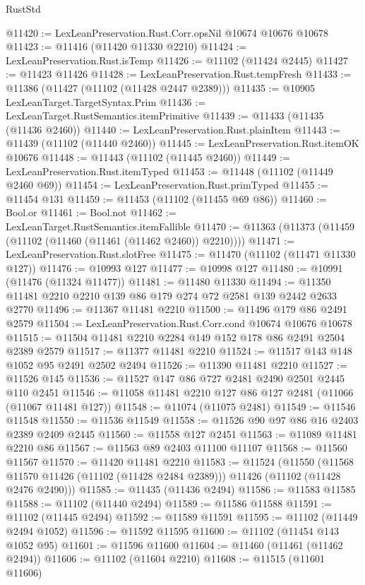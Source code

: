 \begin{lexlean}{RustStd}
\begin{coremodule}
@11420 := LexLeanPreservation.Rust.Corr.opsNil @10674 @10676 @10678
@11423 := @11416 (@11420 @11330 @2210)
@11424 := LexLeanPreservation.Rust.isTemp
@11426 := @11102 (@11424 @2445)
@11427 := @11423 @11426
@11428 := LexLeanPreservation.Rust.tempFresh
@11433 := @11386 (@11427 (@11102 (@11428 @2447 @2389)))
@11435 := @10905 LexLeanTarget.TargetSyntax.Prim
@11436 := LexLeanTarget.RustSemantics.itemPrimitive
@11439 := @11433 (@11435 (@11436 @2460))
@11440 := LexLeanPreservation.Rust.plainItem
@11443 := @11439 (@11102 (@11440 @2460))
@11445 := LexLeanPreservation.Rust.itemOK @10676
@11448 := @11443 (@11102 (@11445 @2460))
@11449 := LexLeanPreservation.Rust.itemTyped
@11453 := @11448 (@11102 (@11449 @2460 @69))
@11454 := LexLeanPreservation.Rust.primTyped
@11455 := @11454 @131
@11459 := @11453 (@11102 (@11455 @69 @86))
@11460 := Bool.or
@11461 := Bool.not
@11462 := LexLeanTarget.RustSemantics.itemFallible
@11470 := @11363 (@11373 (@11459 (@11102 (@11460 (@11461 (@11462 @2460)) @2210))))
@11471 := LexLeanPreservation.Rust.slotFree
@11475 := @11470 (@11102 (@11471 @11330 @127))
@11476 := @10993 @127
@11477 := @10998 @127
@11480 := @10991 (@11476 (@11324 @11477))
@11481 := @11480 @11330
@11494 := @11350 @11481 @2210 @2210 @139 @86 @179 @274 @72 @2581 @139 @2442 @2633 @2770
@11496 := @11367 @11481 @2210
@11500 := @11496 @179 @86 @2491 @2579
@11504 := LexLeanPreservation.Rust.Corr.cond @10674 @10676 @10678
@11515 := @11504 @11481 @2210 @2284 @149 @152 @178 @86 @2491 @2504 @2389 @2579
@11517 := @11377 @11481 @2210
@11524 := @11517 @143 @148 @1052 @95 @2491 @2502 @2494
@11526 := @11390 @11481 @2210
@11527 := @11526 @145
@11536 := @11527 @147 @86 @727 @2481 @2490 @2501 @2445 @110 @2451
@11546 := @11058 @11481 @2210 @127 @86 @127 @2481 (@11066 (@11067 @11481 @127))
@11548 := @11074 (@11075 @2481)
@11549 := @11546 @11548
@11550 := @11536 @11549
@11558 := @11526 @90 @97 @86 @16 @2403 @2389 @2409 @2445
@11560 := @11558 @127 @2451
@11563 := @11089 @11481 @2210 @86
@11567 := @11563 @89 @2403 @11100 @11107
@11568 := @11560 @11567
@11570 := @11420 @11481 @2210
@11583 := @11524
    (@11550
      (@11568 @11570 @11426 (@11102 (@11428 @2484 @2389)))
      @11426
      (@11102 (@11428 @2476 @2490)))
@11585 := @11435 (@11436 @2494)
@11586 := @11583 @11585
@11588 := @11102 (@11440 @2494)
@11589 := @11586 @11588
@11591 := @11102 (@11445 @2494)
@11592 := @11589 @11591
@11595 := @11102 (@11449 @2494 @1052)
@11596 := @11592 @11595
@11600 := @11102 (@11454 @143 @1052 @95)
@11601 := @11596 @11600
@11604 := @11460 (@11461 (@11462 @2494))
@11606 := @11102 (@11604 @2210)
@11608 := @11515 (@11601 @11606)

\end{coremodule}
\end{lexlean}
